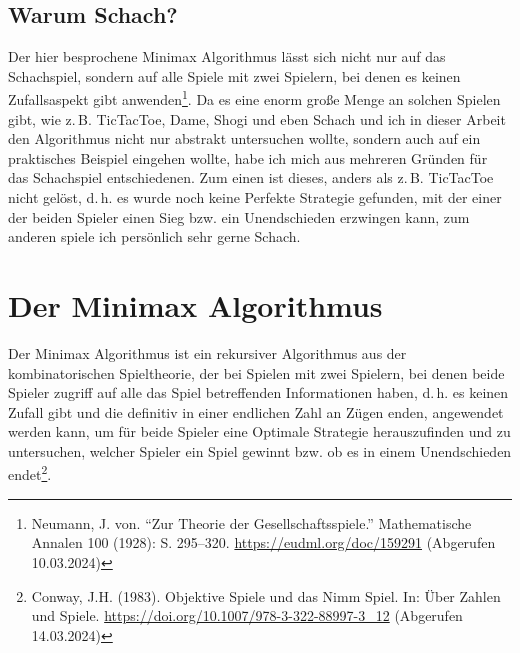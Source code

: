 \documentclass[12pt, a4paper, oneside, openright]{article}
\newcommand \zB{z.\,B.\xspace }
\newcommand \dasheisst{d.\,h.\xspace }
\newcommand \bzw{bzw.\xspace }
\begin{document}
\subsection{Warum Schach?}\label{subsec:warum-schach?}
Der hier besprochene Minimax Algorithmus lässt sich nicht nur auf das Schachspiel, sondern auf alle Spiele mit zwei Spielern, bei denen es keinen Zufallsaspekt gibt anwenden\footnote{Neumann, J. von. \enquote{Zur Theorie der Gesellschaftsspiele.} Mathematische Annalen 100 (1928): S. 295--320. \url{https://eudml.org/doc/159291} (Abgerufen 10.03.2024)}.
Da es eine enorm große Menge an solchen Spielen gibt, wie \zB TicTacToe, Dame, Shogi und eben Schach und ich in dieser Arbeit den Algorithmus nicht nur abstrakt untersuchen wollte, sondern auch auf ein praktisches Beispiel eingehen wollte, habe ich mich aus mehreren Gründen für das Schachspiel entschiedenen.
Zum einen ist dieses, anders als \zB TicTacToe nicht gelöst, \dasheisst es wurde noch keine Perfekte Strategie gefunden, mit der einer der beiden Spieler einen Sieg \bzw ein Unendschieden erzwingen kann, zum anderen spiele ich persönlich sehr gerne Schach.

\section{Der Minimax Algorithmus}\label{sec:der-minimax-algorithmus}
Der Minimax Algorithmus ist ein rekursiver Algorithmus aus der kombinatorischen Spieltheorie, der bei Spielen mit zwei Spielern, bei denen beide Spieler zugriff auf alle das Spiel betreffenden Informationen haben, \dasheisst es keinen Zufall gibt und die definitiv in einer endlichen Zahl an Zügen enden, angewendet werden kann, um für beide Spieler eine Optimale Strategie herauszufinden und zu untersuchen, welcher Spieler ein Spiel gewinnt \bzw ob es in einem Unendschieden endet\footnote{Conway, J.H. (1983). Objektive Spiele und das Nimm Spiel. In: Über Zahlen und Spiele. \url{https://doi.org/10.1007/978-3-322-88997-3_12} (Abgerufen 14.03.2024)}.
\end{document}
